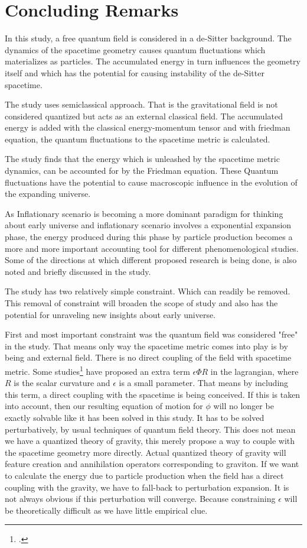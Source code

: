\chapter{Concluding Remarks}

In this study, a free quantum field is considered in a de-Sitter background. The dynamics of the spacetime geometry causes quantum fluctuations which materializes as particles. The accumulated energy in turn influences the geometry itself and which has the potential for causing instability of the de-Sitter spacetime.

The study uses semiclassical approach. That is the gravitational field is not considered quantized but acts as an external classical field. The accumulated energy is added with the classical energy-momentum tensor and with friedman equation, the quantum fluctuations to the spacetime metric is calculated. 


The study finds that the energy which is unleashed by the spacetime metric dynamics, can be accounted for by the Friedman equation. These Quantum fluctuations have the potential to cause macroscopic influence in the evolution of the expanding universe.

As Inflationary scenario is becoming a  more dominant paradigm for thinking about early universe and inflationary scenario involves a exponential expansion phase, the energy produced during this phase by particle production becomes a more and more important accounting tool for different phenomenological studies. Some of the directions at which different proposed research is being done, is also noted and briefly discussed in the study.

The study has two relatively simple constraint. Which can readily be removed. This removal of constraint will broaden the scope of study and also has the potential for unraveling new insights about early universe.

First and most important constraint was the quantum field was considered "free" in the study. That means only way the spacetime metric comes into play is by being and external field. There is no direct coupling of the field with spacetime metric. Some studies\footcite{ford:1987} have proposed an extra term $\epsilon\Phi R$ in the lagrangian, where $R$ is the scalar curvature and $\epsilon$ is a small parameter. That means by including this term, a direct coupling with the spacetime is being conceived. If this is taken into account, then our resulting equation of motion for $\phi$ will no longer be exactly solvable like it has been solved in this study. It has to be solved perturbatively, by usual techniques of quantum field theory. This does not mean we have a quantized theory of gravity, this merely propose a way to couple with the spacetime geometry more directly. Actual quantized theory of gravity will feature creation and annihilation operators corresponding to graviton. If we want to calculate the energy due to particle production when the field has a direct coupling with the gravity, we have to fall-back to perturbation expansion. It is not always obvious if this perturbation will converge. Because constraining $\epsilon$ will be theoretically difficult as we have little empirical clue.

